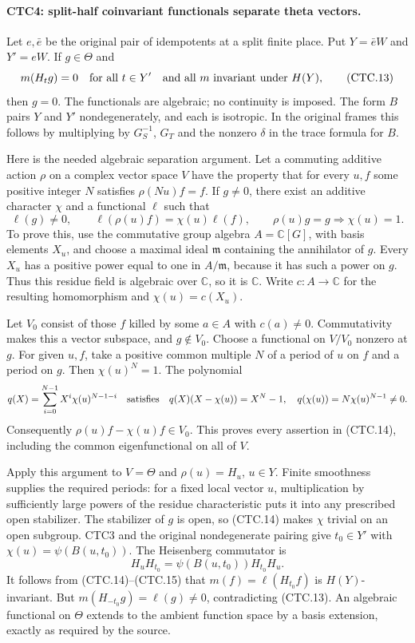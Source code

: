 \paragraph{CTC4: split-half coinvariant functionals separate theta vectors.}
\label{claim:CTC4}
Let $e,\bar e$ be the original pair of idempotents at a split finite
place.  Put $Y=\bar eW$ and $Y'=eW$.  If $g\in\Theta$ and
\[
 m(H_tg)=0\quad\hbox{for all }t\in Y'
 \quad\hbox{and all }m\hbox{ invariant under }H(Y),
 \tag{CTC.13}
\]
then $g=0$.  The functionals are algebraic; no continuity is imposed.
The form $B$ pairs $Y$ and $Y'$ nondegenerately, and each is isotropic.
In the original frames this follows by multiplying by $G_S^{-1}$,
$G_T$ and the nonzero $\delta$ in the trace formula for $B$.

Here is the needed algebraic separation argument.  Let a commuting
additive action $\rho$ on a complex vector space $V$ have the property
that for every $u,f$ some positive integer $N$ satisfies
$\rho(Nu)f=f$.  If $g\ne0$, there exist an additive character $\chi$
and a functional $\ell$ such that
\[
 \ell(g)\ne0,\qquad \ell(\rho(u)f)=\chi(u)\ell(f),
 \qquad \rho(u)g=g\Longrightarrow\chi(u)=1.
 \tag{CTC.14}
\]
To prove this, use the commutative group algebra
$A=\mathbb C[G]$, with basis elements $X_u$, and choose a maximal
ideal $\mathfrak m$ containing the annihilator of $g$.
Every $X_u$ has a positive power equal to one in $A/\mathfrak m$,
because it has such a power on $g$.  Thus this residue field is
algebraic over $\mathbb C$, so it is $\mathbb C$.  Write
$c:A\to\mathbb C$ for the resulting homomorphism and
$\chi(u)=c(X_u)$.

Let $V_0$ consist of those $f$ killed by some $a\in A$ with
$c(a)\ne0$.  Commutativity makes this a vector subspace, and
$g\notin V_0$.  Choose a functional on $V/V_0$ nonzero at $g$.
For given $u,f$, take a positive common multiple $N$ of a period of
$u$ on $f$ and a period on $g$.  Then $\chi(u)^N=1$.  The polynomial
\[
 q(X)=\sum_{i=0}^{N-1}X^i\chi(u)^{N-1-i}
 \quad\hbox{satisfies}\quad
 q(X)(X-\chi(u))=X^N-1,
 \quad q(\chi(u))=N\chi(u)^{N-1}\ne0.
\]
Consequently $\rho(u)f-\chi(u)f\in V_0$.  This proves every assertion
in (CTC.14), including the common eigenfunctional on all of $V$.

Apply this argument to $V=\Theta$ and $\rho(u)=H_u$, $u\in Y$.
Finite smoothness supplies the required periods: for a fixed local
vector $u$, multiplication by sufficiently large powers of the
residue characteristic puts it into any prescribed open stabilizer.
The stabilizer of $g$ is open, so (CTC.14) makes $\chi$ trivial on
an open subgroup.  CTC3 and the original nondegenerate pairing give
$t_0\in Y'$ with $\chi(u)=\psi(B(u,t_0))$.
The Heisenberg commutator is
\[
 H_uH_{t_0}=\psi(B(u,t_0))H_{t_0}H_u.
 \tag{CTC.15}
\]
It follows from (CTC.14)--(CTC.15) that
$m(f)=\ell(H_{t_0}f)$ is $H(Y)$-invariant.  But
$m(H_{-t_0}g)=\ell(g)\ne0$, contradicting (CTC.13).
An algebraic functional on $\Theta$ extends to the ambient function
space by a basis extension, exactly as required by the source.

